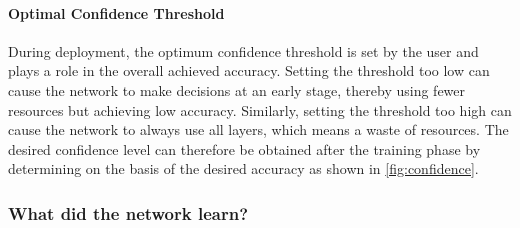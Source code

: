 \documentclass[conference]{IEEEtran}
\newcommand{\mynote}[3]{
    \fbox{\bfseries\sffamily\scriptsize#1}
    {\small$\blacktriangleright$\textsf{\emph{\color{#3}{#2}}}$\blacktriangleleft$}}
\newcommand{\todo}[1]{\mynote{TODO}{#1}{red}}
\begin{document}



\paragraph{Optimal Confidence Threshold}
During deployment, the optimum confidence threshold is set by the user and plays a role in the overall achieved accuracy. Setting the threshold too low can cause the network to make decisions at an early stage, thereby using fewer resources but achieving low accuracy. Similarly, setting the threshold too high can cause the network to always use all layers, which means a waste of resources. The desired confidence level can therefore be obtained after the training phase by determining on the basis of the desired accuracy as shown in \autoref{fig:confidence}.


\subsubsection{What did the network learn?}
\end{document}

